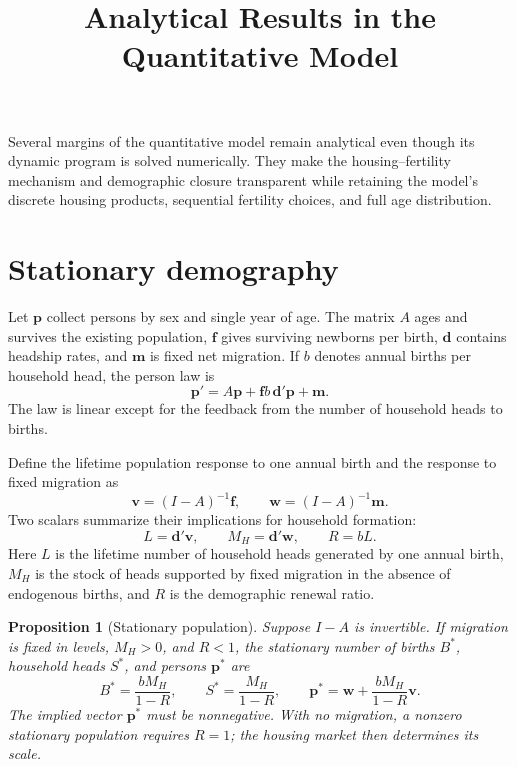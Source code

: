 \documentclass[11pt]{article}
\title{Analytical Results in the Quantitative Model}
\author{}
\date{}
\newtheorem{proposition}{Proposition}
\begin{document}
\maketitle
\vspace{-2.5em}

Several margins of the quantitative model remain analytical even though its
dynamic program is solved numerically.  They make the housing--fertility
mechanism and demographic closure transparent while retaining the model's
discrete housing products, sequential fertility choices, and full age
distribution.

\section{Stationary demography}

Let $\mathbf p$ collect persons by sex and single year of age.  The matrix $A$
ages and survives the existing population, $\mathbf f$ gives surviving
newborns per birth, $\mathbf d$ contains headship rates, and $\mathbf m$ is
fixed net migration.  If $b$ denotes annual births per household head, the
person law is
\begin{equation}
 \mathbf p'=A\mathbf p+\mathbf f b\,\mathbf d'\mathbf p+\mathbf m.
 \label{eq:person_law}
\end{equation}
The law is linear except for the feedback from the number of household heads
to births.

Define the lifetime population response to one annual birth and the response
to fixed migration as
\begin{equation}
 \mathbf v=(I-A)^{-1}\mathbf f,
 \qquad
 \mathbf w=(I-A)^{-1}\mathbf m.
 \label{eq:linear_responses}
\end{equation}
Two scalars summarize their implications for household formation:
\begin{equation}
 L=\mathbf d'\mathbf v,
 \qquad
 M_H=\mathbf d'\mathbf w,
 \qquad
 R=bL.
 \label{eq:renewal_objects}
\end{equation}
Here $L$ is the lifetime number of household heads generated by one annual
birth, $M_H$ is the stock of heads supported by fixed migration in the absence
of endogenous births, and $R$ is the demographic renewal ratio.

\begin{proposition}[Stationary population]
\label{prop:stationary_population}
Suppose $I-A$ is invertible.  If migration is fixed in levels, $M_H>0$, and
$R<1$, the stationary number of births $B^*$, household heads $S^*$, and
persons $\mathbf p^*$ are
\begin{equation}
 B^*=\frac{bM_H}{1-R},
 \qquad
 S^*=\frac{M_H}{1-R},
 \qquad
 \mathbf p^*=\mathbf w+\frac{bM_H}{1-R}\mathbf v.
 \label{eq:stationary_population}
\end{equation}
The implied vector $\mathbf p^*$ must be nonnegative.  With no migration, a
nonzero stationary population requires $R=1$; the housing market then
determines its scale.
\end{proposition}
\end{document}
